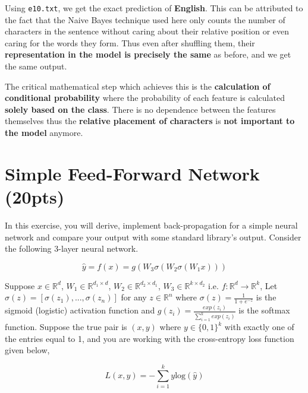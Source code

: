 \documentclass[a4paper]{article}
\theoremstyle{definition}
\newenvironment{soln}{
    \leavevmode\color{blue}\ignorespaces
}{}
\begin{document}
\begin{enumerate}
\begin{soln}
    Using \texttt{e10.txt}, we get the exact prediction of \textbf{English}. This can be attributed to the fact that the Naive Bayes technique used here only counts the number of characters in the sentence without caring about their relative position or even caring for the words they form. Thus even after shuffling them, their \textbf{representation in the model is precisely the same} as before, and we get the same output.

    The critical mathematical step which achieves this is the \textbf{calculation of conditional probability} where the probability of each feature is calculated \textbf{solely based on the class}. There is no dependence between the features themselves thus the \textbf{relative placement of characters} is \textbf{not important to the model} anymore.
\end{soln}

\end{enumerate}

\section{Simple Feed-Forward Network (20pts)}
In this exercise, you will derive, implement back-propagation for a simple neural network and compare your output with some standard library’s output. Consider the following 3-layer neural network.

\[
\hat{y} = f(x) = g(W_3\sigma(W_2\sigma(W_1x)))
\]

Suppose $x \in \mathbb{R}^d$, $W_1 \in \mathbb{R}^{d_1 \times d}$, $W_2 \in \mathbb{R}^{d_2 \times d_1}$, $W_3 \in \mathbb{R}^{k \times d_2}$ i.e. $f: \mathbb{R}^d \rightarrow \mathbb{R}^k$, Let $\sigma(z) = [\sigma(z_1), ..., \sigma(z_n)]$ for any $z \in \mathbb{R}^n$ where $\sigma(z) = \frac{1}{1 + e^{-z}}$ is the sigmoid (logistic) activation function and $g(z_i) = \frac{exp(z_i)}{\sum_{i=1}^k exp(z_i)}$ is the softmax function. Suppose the true pair is $(x, y)$ where $y \in \{0, 1\}^k$ with exactly one of the entries equal to 1, and you are working with the cross-entropy loss function given below,

\[
L(x, y) = -\sum_{i=1}^k y \text{log}(\hat{y})
\]
\end{document}
